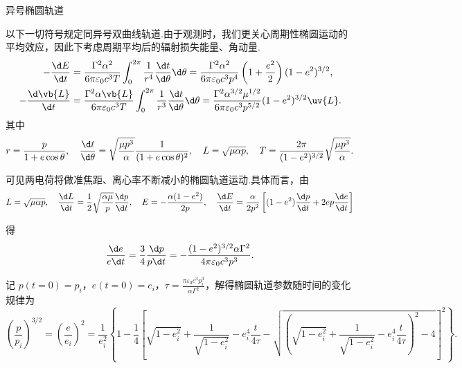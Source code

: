 \begin{example}
	异号椭圆轨道

	以下一切符号规定同异号双曲线轨道.由于观测时，我们更关心周期性椭圆运动的平均效应，因此下考虑周期平均后的辐射损失能量、角动量.
	\begin{align*}
		-\frac{\d E}{\d t} &= \frac{\Gamma^2 \alpha^2}{6\pi\varepsilon_0 c^3 T} \int_{0}^{2\pi} \frac{1}{r^4} \frac{\d t}{\d \theta} \d \theta = \frac{\Gamma^2 \alpha^2}{6\pi\varepsilon_0 c^3 p^4} \left(1 + \frac{e^2}{2}\right) (1 - e^2)^{3/2}, \\
		-\frac{\d \vb{L}}{\d t} &= \frac{\Gamma^2 \alpha \vb{L}}{6\pi\varepsilon_0 c^3 T} \int_{0}^{2\pi} \frac{1}{r^3} \frac{\d t}{\d \theta} \d \theta = \frac{\Gamma^2 \alpha^{3/2} \mu^{1/2}}{6\pi\varepsilon_0 c^3 p^{5/2}} (1 - e^2)^{3/2} \uv{L}.
	\end{align*}
	其中
	\begin{equation*}
		r = \frac{p}{1 + e\cos\theta}, \quad \frac{\d t}{\d \theta} = \sqrt{\frac{\mu p^3}{\alpha}} \frac{1}{(1 + e\cos\theta)^2}, \quad L = \sqrt{\mu\alpha p}, \quad T = \frac{2\pi}{(1 - e^2)^{3/2}} \sqrt{\frac{\mu p^3}{\alpha}}.
	\end{equation*}

	可见两电荷将做准焦距、离心率不断减小的椭圆轨道运动.具体而言，由
	\begin{equation*}
		L = \sqrt{\mu\alpha p}, \quad \frac{\d L}{\d t} = \frac{1}{2}\sqrt{\frac{\alpha\mu}{p}} \frac{\d p}{\d t}, \quad E = -\frac{\alpha(1 - e^2)}{2p}, \quad \frac{\d E}{\d t} = \frac{\alpha}{2p^2}\left[(1 - e^2)\frac{\d p}{\d t} + 2ep\frac{\d e}{\d t}\right]
	\end{equation*}

	得
	\begin{equation*}
		\frac{\d e}{e \d t} = \frac{3}{4}\frac{\d p}{p \d t} = -\frac{(1 - e^2)^{3/2} \alpha \Gamma^2}{4\pi\varepsilon_0 c^3 p^3}.
	\end{equation*}

	记 \(p(t=0) = p_i\)，\(e(t=0) = e_i\)，\(\tau = \frac{\pi\varepsilon_0 c^3 p_i^3}{\alpha \Gamma^2}\)，解得椭圆轨道参数随时间的变化规律为
	\begin{equation*}
		\left(\frac{p}{p_i}\right)^{3/2} = \left(\frac{e}{e_i}\right)^2 = \frac{1}{e_i^2}\left\{1 - \frac{1}{4}\left[\sqrt{1 - e_i^2} + \frac{1}{\sqrt{1 - e_i^2}} - e_i^4 \frac{t}{4\tau} - \sqrt{\left(\sqrt{1 - e_i^2} + \frac{1}{\sqrt{1 - e_i^2}} - e_i^4 \frac{t}{4\tau}\right)^2 - 4}\right]^2\right\}.
	\end{equation*}


\end{example}
